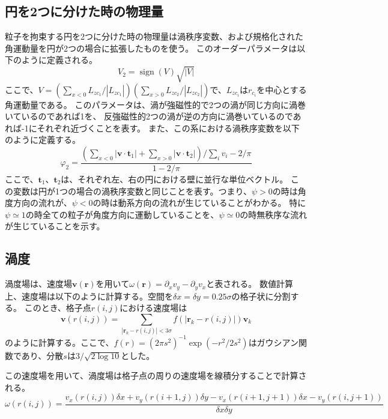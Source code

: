 \documentclass[/Users/ikedahajime/GitHub/reserch/master_report/thesis]{subfiles}
\begin{document}
\subsection{円を2つに分けた時の物理量}
粒子を拘束する円を2つに分けた時の物理量は渦秩序変数、および規格化された角運動量を円が2つの場合に拡張したものを使う。
このオーダーパラメータは以下のように定義される。
\begin{equation}
    V_2={\mathop{\mathrm{sign}}\nolimits} (V)\sqrt{|V|}
\end{equation}
ここで、$V=(\sum_{x<0} L_{zc_1}/|L_{zc_1}|)(\sum_{x>0}L_{zc_2}/|L_{zc_2}|)$で、$L_{zc_i}$は$r_{c_i}$を中心とする角運動量である。
このパラメータは、渦が強磁性的で2つの渦が同じ方向に渦巻いているのであれば1を、
反強磁性的2つの渦が逆の方向に渦巻いているのであれば-1にそれぞれ近づくことを表す。
また、この系における渦秩序変数を以下のように定義する。
\begin{equation}
    \varphi_2=\frac{(\sum_{x<0} \left|\bm{v}\cdot \bm{t}_{1} \right|+\sum_{x>0} \left|\bm{v}\cdot \bm{t}_{2} \right|)/\sum_i v_i -2/\pi}{1-2/\pi}
\end{equation}
ここで、$\bm{t}_1、\bm{t}_2$は、それぞれ左、右の円における壁に並行な単位ベクトル。
この変数は円が1つの場合の渦秩序変数と同じことを表す。つまり、$\psi>0$の時は角度方向の流れが、$\psi<0$の時は動系方向の流れが生じていることがわかる。
特に$\psi\simeq1$の時全ての粒子が角度方向に運動していることを、$\psi\simeq0$の時無秩序な流れが生じていることを示す。




\subsection{渦度}\label{subsec:def_vortex}
渦度場は、速度場$\bm{v}(\bm{r})$を用いて$\omega(\bm{r})=\partial_x v_y -\partial_y v_x$と表される。
数値計算上、速度場は以下のように計算する。空間を$\delta x=\delta y=0.25 \sigma$の格子状に分割する。
このとき、格子点$r(i,j)$における速度場は%
\begin{equation}\label{eq:valocity_field}
    \bm{v}(r(i,j))=\sum_{\left|\bm{r}_k-r(i,j)\right|<3\sigma} f(\left|\bm{r}_k-r(i,j)\right|)\bm{v}_k
\end{equation}
のように計算する。ここで、$f(r)=(2\pi s^2)^{-1} \exp(-r^2/2s^2)$はガウシアン関数であり、分散$s$は$3/\sqrt{2\log 10}$とした。


この速度場を用いて、渦度場は格子点の周りの速度場を線積分することで計算される。
\begin{equation}
    \omega (r(i,j))=\frac{v_x(r(i,j))\delta x +v_y(r(i+1,j)) \delta y -v_x(r(i+1,j+1))\delta x -v_y(r(i,j+1))}{\delta x \delta y}
\end{equation}
\end{document}
